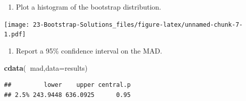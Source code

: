 \documentclass[
]{book}
\newenvironment{Shaded}{\begin{snugshade}}{\end{snugshade}}
\newcommand{\DataTypeTok}[1]{\textcolor[rgb]{0.13,0.29,0.53}{#1}}
\newcommand{\DecValTok}[1]{\textcolor[rgb]{0.00,0.00,0.81}{#1}}
\newcommand{\KeywordTok}[1]{\textcolor[rgb]{0.13,0.29,0.53}{\textbf{#1}}}
\newcommand{\NormalTok}[1]{#1}
\newcommand{\OperatorTok}[1]{\textcolor[rgb]{0.81,0.36,0.00}{\textbf{#1}}}
\newcommand{\StringTok}[1]{\textcolor[rgb]{0.31,0.60,0.02}{#1}}
\providecommand{\tightlist}{%
  \setlength{\itemsep}{0pt}\setlength{\parskip}{0pt}}
\begin{document}
\begin{Shaded}
\end{Shaded}

\begin{enumerate}
\def\labelenumi{\alph{enumi}.}
\setcounter{enumi}{4}
\tightlist
\item
  Plot a histogram of the bootstrap distribution.
\end{enumerate}

\begin{Shaded}
\end{Shaded}

\texttt{[image: 23-Bootstrap-Solutions\_files/figure-latex/unnamed-chunk-7-1.pdf]}

\begin{enumerate}
\def\labelenumi{\alph{enumi}.}
\setcounter{enumi}{5}
\tightlist
\item
  Report a 95\% confidence interval on the MAD.
\end{enumerate}

\begin{Shaded}
\begin{Highlighting}[]
\KeywordTok{cdata}\NormalTok{(}\OperatorTok{~}\NormalTok{mad,}\DataTypeTok{data=}\NormalTok{results)}
\end{Highlighting}
\end{Shaded}

\begin{verbatim}
##         lower    upper central.p
## 2.5% 243.9448 636.0925      0.95
\end{verbatim}
\end{document}
